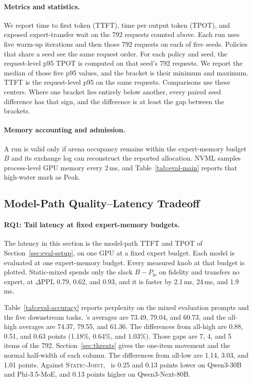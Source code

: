 \paragraph{Metrics and statistics.}
We report time to first token (TTFT), time per output token (TPOT), and exposed expert-transfer wait on the 792 requests counted above. Each run uses five warm-up iterations and then those 792 requests on each of five seeds. Policies that share a seed see the same request order. For each policy and seed, the request-level p95 TPOT is computed on that seed's 792 requests. We report the median of those five p95 values, and the bracket is their minimum and maximum. TTFT is the request-level p95 on the same requests. Comparisons use these centers. Where one bracket lies entirely below another, every paired seed difference has that sign, and the difference is at least the gap between the brackets.

\paragraph{Memory accounting and admission.}
A run is valid only if arena occupancy remains within the expert-memory budget \(B\) and its exchange log can reconstruct the reported allocation. NVML samples process-level GPU memory every 2\,ms, and Table~\ref{tab:eval-main} reports that high-water mark as Peak.

\subsection{Model-Path Quality--Latency Tradeoff}
\label{sec:eval-end-to-end}

\paragraph{RQ1: Tail latency at fixed expert-memory budgets.}
The latency in this section is the model-path TTFT and TPOT of Section~\ref{sec:eval-setup}, on one GPU at a fixed expert budget.
Each model is evaluated at one expert-memory budget. Every measured knob at that budget is plotted. Static-mixed spends only the slack \(B-P_{\mathrm{lo}}\) on fidelity and transfers no expert, at \(\Delta\mathrm{PPL}\) 0.79, 0.62, and 0.93, and it is faster by 2.1\,ms, 24\,ms, and 1.9\,ms.



Table~\ref{tab:eval-accuracy} reports perplexity on the mixed evaluation prompts and the five downstream tasks. \systemname's averages are 73.49, 79.04, and 60.73, and the all-high averages are 74.37, 79.55, and 61.36. The differences from all-high are 0.88, 0.51, and 0.63 points (1.18\%, 0.64\%, and 1.03\%). Those gaps are 7, 4, and 5 items of the 792. Section~\ref{sec:threats} gives the one-item movement and the normal half-width of each column. The differences from all-low are 1.14, 3.03, and 1.01 points. Against \textsc{Static-Joint}, \systemname\ is 0.25 and 0.13 points lower on Qwen3-30B and Phi-3.5-MoE, and 0.13 points higher on Qwen3-Next-80B.


